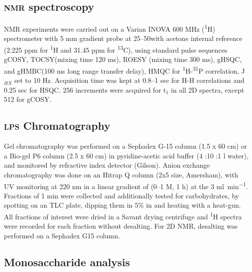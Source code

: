       \subsection{\textsc{nmr} spectroscopy} %
      \label{sub:nmr_spectroscopy}

      \ac{NMR} experiments were carried out on a Varian INOVA 600 \si{\mega\hertz}
      (\textsuperscript{1}H) spectrometer with 5 \si{\milli\meter} gradient probe at 25--50\cel with
      acetone internal reference (2.225 ppm for \textsuperscript{1}H and 31.45 ppm for
      \textsuperscript{13}C), using standard pulse sequences \ac{gCOSY}, \ac{TOCSY}(mixing time 120
      \si{\milli\second}), \ac{ROESY} (mixing time 300 \si{\milli\second}), \ac{gHSQC}, and
      \ac{gHMBC}(100 \si{\milli\second} long range transfer delay), \ac{HMQC} for
      \textsuperscript{1}H-\textsuperscript{31}P correlation, J$_{HX}$ set to 10
      \si{\hertz}. Acquisition time was kept at 0.8--1 sec for H-H correlations and 0.25 sec for
      \ac{HSQC}. 256 increments were acquired for t$_1$ in all 2D spectra, except 512 for \ac{gCOSY}.

      \subsection{\textsc{lps} Chromatography} %
      \label{sub:chromatography}

      Gel chromatography was performed on a Sephadex G-15 column (1.5 x 60 \si{\centi\meter}) or a
      Bio-gel P6 column (2.5 x 60 \si{\centi\meter}) in pyridine-acetic acid buffer (4 \millilitre:10
      \millilitre:1 \si{\litre} water), and monitored by refractive index detector (Gilson). Anion
      exchange chromatography was done on an Hitrap Q column (2x5 \millilitre size, Amersham), with
      \ac{UV} monitoring at 220 nm in a linear gradient of  (0--1 M, 1 h) at the 3
      \si{\milli\litre\per\minute}. Fractions of 1 min were collected and additionally tested for
      carbohydrates, by spotting on an  \ac{TLC} plate, dipping them in 5\%  in
       and heating with a heat-gun. All fractions of interest were dried in a Savant drying
      centrifuge and \textsuperscript{1}H spectra were recorded for each fraction without desalting. For
      2D \ac{NMR}, desalting was performed on a Sephadex G15 column.

      \subsection{Monosaccharide analysis} %
      \label{sub:monosaccharide_analysis}

